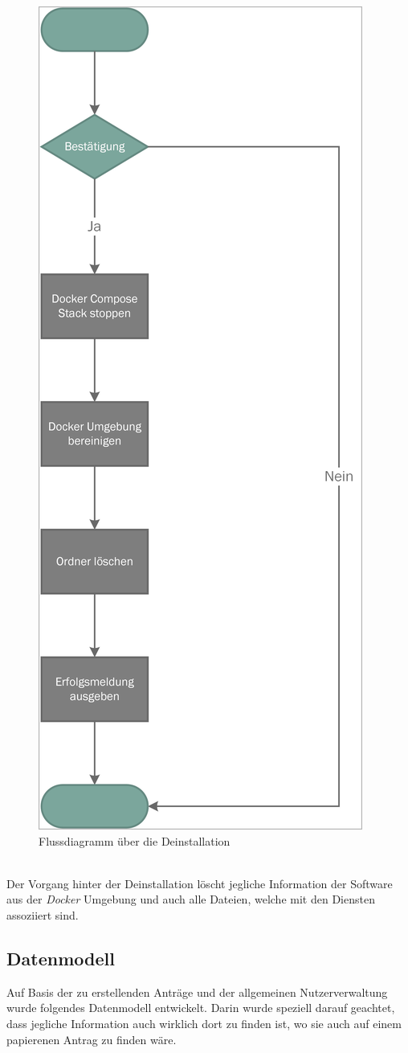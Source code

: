 \begin{figure}[H]
	\centering
	\includegraphics[width=0.48\linewidth]{images/mbeier_konzept/Purge_border}
	\caption[Flussdiagramm über die Deinstallation]{Flussdiagramm über die Deinstallation}
	\label{fig:purge}
\end{figure}
~\\
Der Vorgang hinter der Deinstallation löscht jegliche Information der Software aus der \textit{Docker} Umgebung und auch alle Dateien, welche mit den Diensten assoziiert sind.

\newpage

\subsection{Datenmodell}

Auf Basis der zu erstellenden Anträge und der allgemeinen Nutzerverwaltung wurde folgendes Datenmodell entwickelt. Darin wurde speziell darauf geachtet, dass jegliche Information auch wirklich dort zu finden ist, wo sie auch auf einem papierenen Antrag zu finden wäre. 

